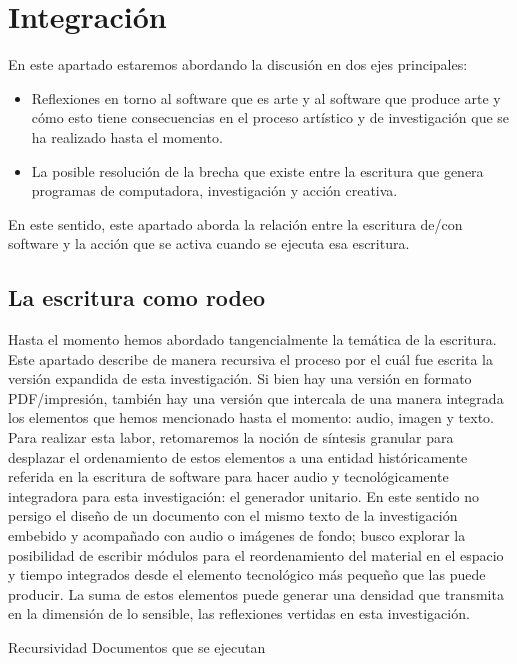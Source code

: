 \chapter{Integración} 

En este apartado estaremos abordando la discusión en dos ejes principales:

\begin{itemize}
\item Reflexiones en torno al software que es arte y al software que produce arte y cómo esto tiene consecuencias en el proceso artístico y de investigación que se ha realizado hasta el momento. 
\item La posible resolución de la brecha que existe entre la escritura que genera programas de computadora, investigación y acción creativa. 
\end{itemize}

En este sentido, este apartado aborda la relación entre la escritura de/con software y la acción que se activa cuando se ejecuta esa escritura. 

\section{La escritura como rodeo}

Hasta el momento hemos abordado tangencialmente la temática de la escritura. Este apartado describe de manera recursiva el proceso por el cuál fue escrita la versión expandida de esta investigación. Si bien hay una versión en formato PDF/impresión, también hay una versión que intercala de una manera integrada los elementos que hemos mencionado hasta el momento: audio, imagen y texto. Para realizar esta labor, retomaremos la noción de síntesis granular para desplazar el ordenamiento de estos elementos a una entidad históricamente referida en la escritura de software para hacer audio y tecnológicamente integradora para esta investigación: el generador unitario. En este sentido no persigo el diseño de un documento con el mismo texto de la investigación embebido y acompañado con audio o imágenes de fondo; busco explorar la posibilidad de escribir módulos para el reordenamiento del material en el espacio y tiempo integrados desde el elemento tecnológico más pequeño que las puede producir. La suma de estos elementos puede generar una densidad que transmita en la dimensión de lo sensible, las reflexiones vertidas en esta investigación. 


Recursividad
Documentos que se ejecutan 

